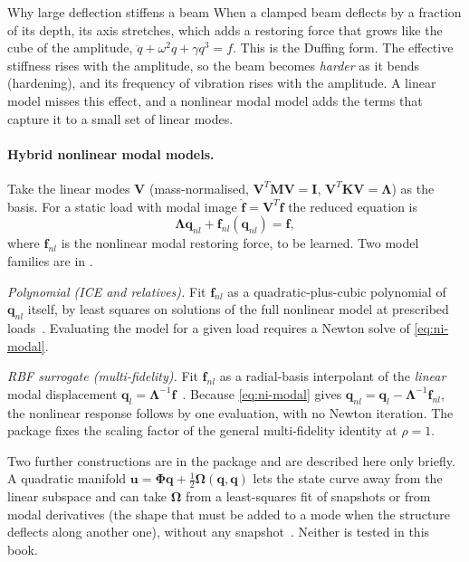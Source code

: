 \begin{sidenote}{Why large deflection stiffens a beam}
When a clamped beam deflects by a fraction of its depth, its axis stretches, which adds a restoring force that grows like the cube of the amplitude, $\ddot q+\omega^2q+\gamma q^3=f$. This is the Duffing form. The effective stiffness rises with the amplitude, so the beam becomes \emph{harder} as it bends (hardening), and its frequency of vibration rises with the amplitude. A linear model misses this effect, and a nonlinear modal model adds the terms that capture it to a small set of linear modes.
\end{sidenote}

\paragraph{Hybrid nonlinear modal models.}
Take the linear modes $\bm V$ (mass-normalised, $\bm V^T\bm M\bm V=\bm I$, $\bm V^T\bm K\bm V=\bm\Lambda$) as the basis. For a static load with modal image $\hat{\bm f}=\bm V^T\bm f$ the reduced equation is
\begin{equation}\label{eq:ni-modal}
\bm\Lambda\bm q_{nl}+\bm f_{nl}(\bm q_{nl})=\hat{\bm f},
\end{equation}
where $\bm f_{nl}$ is the nonlinear modal restoring force, to be learned. Two model families are in \rom{}.

\emph{Polynomial (ICE and relatives).} Fit $\bm f_{nl}$ as a quadratic-plus-cubic polynomial of $\bm q_{nl}$ itself, by least squares on solutions of the full nonlinear model at prescribed loads~\cite{hollkamp2008ice,mignolet2013review}. Evaluating the model for a given load requires a Newton solve of \eqref{eq:ni-modal}.

\emph{RBF surrogate (multi-fidelity).} Fit $\bm f_{nl}$ as a radial-basis interpolant of the \emph{linear} modal displacement $\bm q_l=\bm\Lambda^{-1}\hat{\bm f}$~\cite{he2023mfsnlrom}. Because \eqref{eq:ni-modal} gives $\bm q_{nl}=\bm q_l-\bm\Lambda^{-1}\bm f_{nl}$, the nonlinear response follows by one evaluation, with no Newton iteration. The package fixes the scaling factor of the general multi-fidelity identity at $\rho=1$.

Two further constructions are in the package and are described here only briefly. A quadratic manifold $\bm u=\bm\Phi\bm q+\tfrac12\bm\Omega(\bm q,\bm q)$ lets the state curve away from the linear subspace and can take $\bm\Omega$ from a least-squares fit of snapshots or from modal derivatives (the shape that must be added to a mode when the structure deflects along another one), without any snapshot~\cite{jain2017qm}. Neither is tested in this book.

